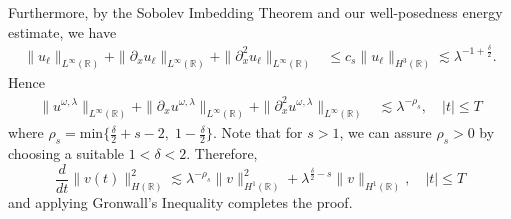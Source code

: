 \documentclass{beamer}
\newcommand{\rr}{\mathbb{R}}
\newcommand{\p}{\partial}
\begin{document}
\begin{frame}
Furthermore, by the Sobolev Imbedding Theorem and our well-posedness energy 
estimate, we have
%
%
%
%
\begin{equation*}
\begin{split}
\|u_\ell\|_{L^\infty(\rr)} + \|\p_x u_\ell \|_{L^\infty(\rr)} + \|\p_x^2
u_\ell\|_{L^\infty(\rr)}
& \le c_s \|u_\ell\|_{H^3(\rr)} 
 \lesssim \lambda^{-1 + \frac{\delta}{2}}. 
\label{apple55}
\end{split}
\end{equation*}
%
%
Hence
%
%
\begin{equation*}
\begin{split}
\|u^{\omega,\lambda}\|_{L^\infty(\rr)} + \|\p_x 
u^{\omega,\lambda}\|_{L^\infty(\rr)} + \|\p_x^2
u^{\omega,\lambda}\|_{L^\infty(\rr)}
& \lesssim \lambda^{-\rho_s}, \quad |t| \le T
\label{apple56}
\end{split}
\end{equation*}
%
%
where $\rho_s = \text{min} \Big\{ \frac{\delta}{2} + s -2, \; 1-
\frac{\delta}{2} \Big\}$.  Note that for $s>1$, we can assure $\rho_s > 0$
by choosing a suitable $1<\delta<2$.
Therefore, 
%
\begin{equation*}
\label{apple58}
\frac{d}{dt} \|v(t)\|_{H(\rr)}^2 \lesssim \lambda^{-\rho_s}
\|v\|_{H^1(\rr)}^2 + \lambda^{\frac{\delta}{2} -s}
\|v \|_{H^1(\rr)}, \quad |t| \le T
\end{equation*}
%
%
and applying Gronwall's Inequality completes the proof. \qquad \qedsymbol%
%
%
\end{frame}
\end{document}
